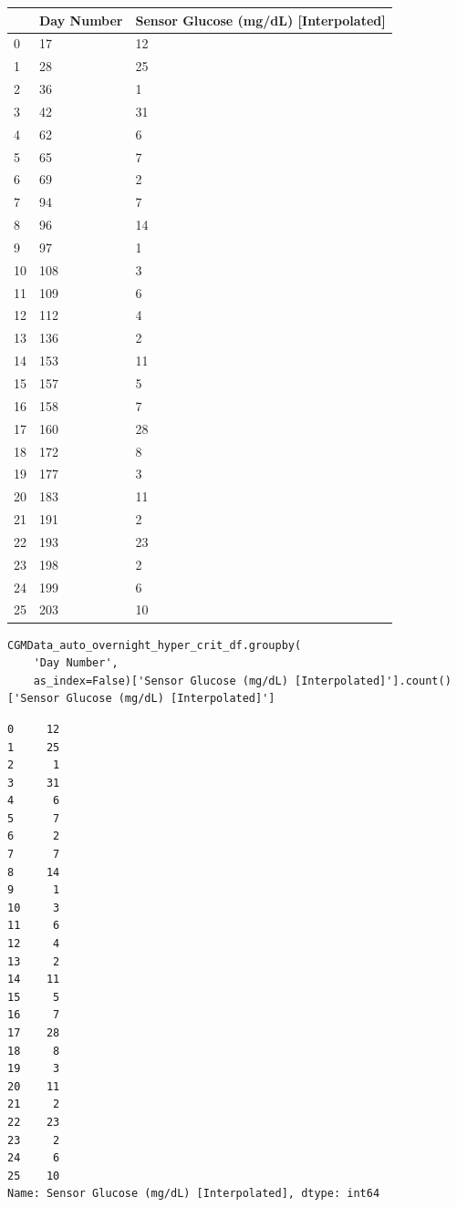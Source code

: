 \bigskip\noindent
\begin{tabular}{p{}p{}p{}}
\toprule
 & Day Number & Sensor Glucose (mg/dL) [Interpolated] \\
\hline
0 & 17 & 12 \\
\hline
1 & 28 & 25 \\
\hline
2 & 36 & 1 \\
\hline
3 & 42 & 31 \\
\hline
4 & 62 & 6 \\
\hline
5 & 65 & 7 \\
\hline
6 & 69 & 2 \\
\hline
7 & 94 & 7 \\
\hline
8 & 96 & 14 \\
\hline
9 & 97 & 1 \\
\hline
10 & 108 & 3 \\
\hline
11 & 109 & 6 \\
\hline
12 & 112 & 4 \\
\hline
13 & 136 & 2 \\
\hline
14 & 153 & 11 \\
\hline
15 & 157 & 5 \\
\hline
16 & 158 & 7 \\
\hline
17 & 160 & 28 \\
\hline
18 & 172 & 8 \\
\hline
19 & 177 & 3 \\
\hline
20 & 183 & 11 \\
\hline
21 & 191 & 2 \\
\hline
22 & 193 & 23 \\
\hline
23 & 198 & 2 \\
\hline
24 & 199 & 6 \\
\hline
25 & 203 & 10 \\
\hline
\bottomrule
\end{tabular}

\bigskip

\begin{verbatim}
CGMData_auto_overnight_hyper_crit_df.groupby(
    'Day Number', 
    as_index=False)['Sensor Glucose (mg/dL) [Interpolated]'].count()['Sensor Glucose (mg/dL) [Interpolated]']
\end{verbatim}

\begin{verbatim}
0     12
1     25
2      1
3     31
4      6
5      7
6      2
7      7
8     14
9      1
10     3
11     6
12     4
13     2
14    11
15     5
16     7
17    28
18     8
19     3
20    11
21     2
22    23
23     2
24     6
25    10
Name: Sensor Glucose (mg/dL) [Interpolated], dtype: int64
\end{verbatim}

